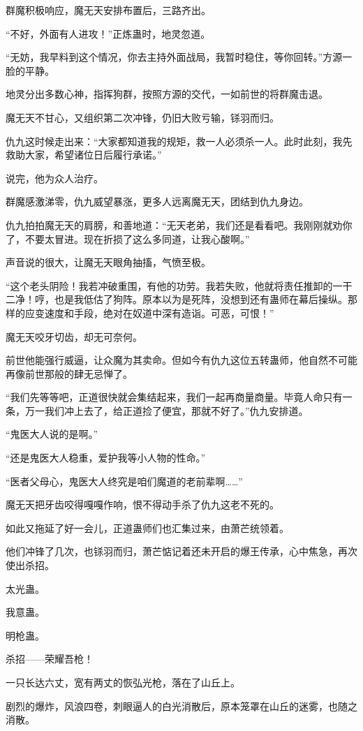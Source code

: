 \begin{this_body}
群魔积极响应，魔无天安排布置后，三路齐出。

“不好，外面有人进攻！”正炼蛊时，地灵忽道。

“无妨，我早料到这个情况，你去主持外面战局，我暂时稳住，等你回转。”方源一脸的平静。

地灵分出多数心神，指挥狗群，按照方源的交代，一如前世的将群魔击退。

魔无天不甘心，又组织第二次冲锋，仍旧大败亏输，铩羽而归。

仇九这时候走出来：“大家都知道我的规矩，救一人必须杀一人。此时此刻，我先救助大家，希望诸位日后履行承诺。”

说完，他为众人治疗。

群魔感激涕零，仇九威望暴涨，更多人远离魔无天，团结到仇九身边。

仇九拍拍魔无天的肩膀，和善地道：“无天老弟，我们还是看看吧。我刚刚就劝你了，不要太冒进。现在折损了这么多同道，让我心酸啊。”

声音说的很大，让魔无天眼角抽搐，气愤至极。

“这个老头阴险！我若冲破重围，有他的功劳。我若失败，他就将责任推卸的一干二净！哼，也是我低估了狗阵。原本以为是死阵，没想到还有蛊师在幕后操纵。那样的应变速度和手段，绝对在奴道中深有造诣。可恶，可恨！”

魔无天咬牙切齿，却无可奈何。

前世他能强行威逼，让众魔为其卖命。但如今有仇九这位五转蛊师，他自然不可能再像前世那般的肆无忌惮了。

“我们先等等吧，正道很快就会集结起来，我们一起再商量商量。毕竟人命只有一条，万一我们冲上去了，给正道捡了便宜，那就不好了。”仇九安排道。

“鬼医大人说的是啊。”

“还是鬼医大人稳重，爱护我等小人物的性命。”

“医者父母心，鬼医大人终究是咱们魔道的老前辈啊……”

魔无天把牙齿咬得嘎嘎作响，恨不得动手杀了仇九这老不死的。

如此又拖延了好一会儿，正道蛊师们也汇集过来，由萧芒统领着。

他们冲锋了几次，也铩羽而归，萧芒惦记着还未开启的爆王传承，心中焦急，再次使出杀招。

太光蛊。

我意蛊。

明枪蛊。

杀招——荣耀吾枪！

一只长达六丈，宽有两丈的恢弘光枪，落在了山丘上。

剧烈的爆炸，风浪四卷，刺眼逼人的白光消散后，原本笼罩在山丘的迷雾，也随之消散。


\end{this_body}
